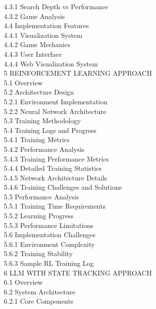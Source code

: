 \documentclass[11pt,a4paper]{report}
\begin{document}
4.3.1 Search Depth vs Performance \\
4.3.2 Game Analysis \\
4.4 Implementation Features \\
4.4.1 Visualization System \\
4.4.2 Game Mechanics \\
4.4.3 User Interface \\
4.4.4 Web Visualization System \\
5 REINFORCEMENT LEARNING APPROACH \\
5.1 Overview \\
5.2 Architecture Design \\
5.2.1 Environment Implementation \\
5.2.2 Neural Network Architecture \\
5.3 Training Methodology \\
5.4 Training Logs and Progress \\
5.4.1 Training Metrics \\
5.4.2 Performance Analysis \\
5.4.3 Training Performance Metrics \\
5.4.4 Detailed Training Statistics \\
5.4.5 Network Architecture Details \\
5.4.6 Training Challenges and Solutions \\
5.5 Performance Analysis \\
5.5.1 Training Time Requirements \\
5.5.2 Learning Progress \\
5.5.3 Performance Limitations \\
5.6 Implementation Challenges \\
5.6.1 Environment Complexity \\
5.6.2 Training Stability \\
5.6.3 Sample RL Training Log \\
6 LLM WITH STATE TRACKING APPROACH \\
6.1 Overview \\
6.2 System Architecture \\
6.2.1 Core Components \\
\end{document}
